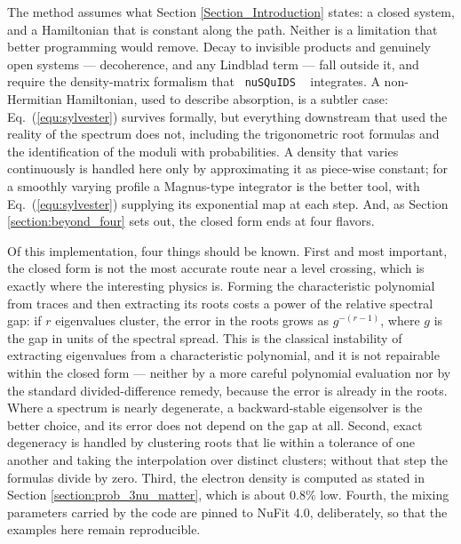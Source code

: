 \documentclass[final,5p,times,twocolumn]{elsarticle}
\newcommand{\eq}{Eq.}
\newcommand{\equ}[1]{\eq~(\ref{equ:#1})}
\newcounter{bla}
\providecommand{\DIFaddtex}[1]{{\protect\color{blue} \sf #1}} %
\providecommand{\DIFadd}[1]{\DIFaddtex{#1}} %
\begin{document}
\DIFadd{The method assumes what Section \ref{Section_Introduction} states: a closed system, and a Hamiltonian that is constant along the path.  Neither is a limitation that better programming would remove.  Decay to invisible products and genuinely open systems --- decoherence, and any Lindblad term --- fall outside it, and require the density-matrix formalism that }{\tt \DIFadd{nuSQuIDS}}\DIFadd{\ }\cite{Delgado:2014kpa, NuSQuIDS} \DIFadd{integrates.  A non-Hermitian Hamiltonian, used to describe absorption, is a subtler case: \equ{sylvester} survives formally, but everything downstream that used the reality of the spectrum does not, including the trigonometric root formulas and the identification of the moduli with probabilities.  A density that varies continuously is handled here only by approximating it as piece-wise constant; for a smoothly varying profile a Magnus-type integrator is the better tool, with \equ{sylvester} supplying its exponential map at each step.  And, as Section \ref{section:beyond_four} sets out, the closed form ends at four flavors.
}

\DIFadd{Of this implementation, four things should be known.  First and most important, the closed form is not the most accurate route near a level crossing, which is exactly where the interesting physics is.  Forming the characteristic polynomial from traces and then extracting its roots costs a power of the relative spectral gap: if $r$ eigenvalues cluster, the error in the roots grows as $g^{-(r-1)}$, where $g$ is the gap in units of the spectral spread.  This is the classical instability of extracting eigenvalues from a characteristic polynomial, and it is not repairable within the closed form --- neither by a more careful polynomial evaluation nor by the standard divided-difference remedy, because the error is already in the roots.  Where a spectrum is nearly degenerate, a backward-stable eigensolver is the better choice, and its error does not depend on the gap at all.  Second, exact degeneracy is handled by clustering roots that lie within a tolerance of one another and taking the interpolation over distinct clusters; without that step the formulas divide by zero.  Third, the electron density is computed as stated in Section \ref{section:prob_3nu_matter}, which is about $0.8\%$ low.  Fourth, the mixing parameters carried by the code are pinned to NuFit 4.0, deliberately, so that the examples here remain reproducible.
}
\end{document}
